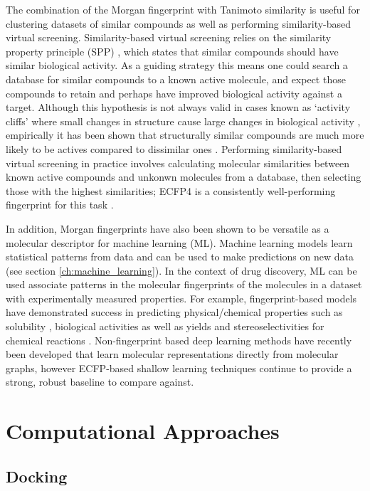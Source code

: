 The combination of the Morgan fingerprint with Tanimoto similarity is useful for clustering \cite{Butina1999Clustering} datasets of similar compounds as well as performing similarity-based virtual screening. Similarity-based virtual screening relies on the  similarity property principle (SPP) \cite{johnson1990concepts}, which states that similar compounds should have similar biological activity. As a guiding strategy this means one could search a database for similar compounds to a known active molecule, and expect those compounds to retain and perhaps have improved biological activity against a target. Although this hypothesis is not always valid in cases known as `activity cliffs' where small changes in structure cause large changes in biological activity \cite{maggiora2006cliffs}, empirically it has been shown that structurally similar compounds are much more likely to be actives compared to dissimilar ones \cite{martin2002similar}. Performing similarity-based virtual screening in practice involves calculating molecular similarities between known active compounds and unkonwn molecules from a database, then selecting those with the highest similarities; ECFP4 is a consistently well-performing fingerprint for this task \cite{riniker2013benchmark, oboyle2016benchmark}.

In addition, Morgan fingerprints have also been shown to be versatile as a molecular descriptor for machine learning (ML). Machine learning models learn statistical patterns from data and can be used to make predictions on new data (see section \ref{ch:machine_learning}). In the context of drug discovery, ML can be used associate patterns in the molecular fingerprints of the molecules in a dataset with experimentally measured properties. For example, fingerprint-based models have demonstrated success in predicting physical/chemical properties such as solubility \cite{wu2017molnet}, biological activities \cite{Bender2019} as well as yields and stereoselectivities for chemical reactions \cite{sandfort2020yield}. Non-fingerprint based deep learning methods have recently been developed that learn molecular representations directly from molecular graphs, however ECFP-based shallow learning techniques continue to provide a strong, robust baseline to compare against.

\section{Computational Approaches}

\subsection{Docking}

